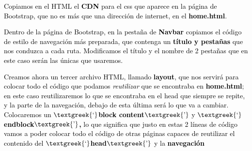 \documentclass[a4paper]{article}
\begin{document}
\bigskip

{
\textcolor{black}{Copiamos en el HTML el }\textbf{\textcolor{black}{CDN}}\textcolor{black}{ para el css que aparece en
la página de Bootstrap, que no es más que una dirección de internet, en el
}\textbf{\textcolor{black}{home.html}}\textcolor{black}{.}}





\bigskip

{
\textcolor{black}{Dentro de la página de Bootstrap, en la pestaña de
}\textbf{\textcolor{black}{Navbar}}\textcolor{black}{ copiamos el código de estilo de navegación más preparada, que
contenga un }\textbf{\textcolor{black}{título y pestañas}}\textcolor{black}{ que nos conduzca a cada ruta. Modificamos
el título y el nombre de 2 pestañas que en este caso serán las únicas que usaremos.}}





\bigskip

{
\textcolor{black}{Creamos ahora un tercer archivo HTML, llamado }\textbf{\textcolor{black}{layout}}\textcolor{black}{,
que nos servirá para colocar todo el código que podamos }\textit{\textcolor{black}{reutilizar}}\textcolor{black}{ que
se encontraba en }\textbf{\textcolor{black}{home.html}}\textcolor{black}{; en este caso reutilizaremos lo que se
encontraba en el head que siempre se repite, y la parte de la navegación, debajo de esta última será lo que va a
cambiar. Colocaremos un }\textbf{\textcolor{black}{$\text{\textgreek{‘}}$block
content$\text{\textgreek{’}}$}}\textcolor{black}{ y
}\textbf{\textcolor{black}{$\text{\textgreek{‘}}$endblock$\text{\textgreek{’}}$,}}\textcolor{black}{ lo que significa
que justo en estas 2 líneas de código vamos a poder colocar todo el código de otras páginas capaces de reutilizar el
contenido del }\textbf{\textcolor{black}{$\text{\textgreek{‘}}$head$\text{\textgreek{’}}$ }}\textcolor{black}{y la
}\textbf{\textcolor{black}{navegación}}}


\end{document}

